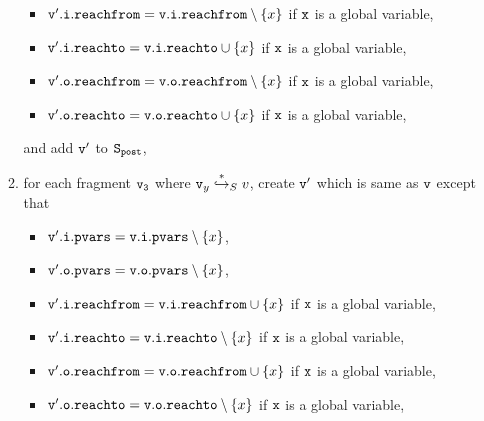 \begin{itemize}
\begin{enumerate}
\begin{itemize}
\item $\mathtt{v}'.\mathtt{i}.\mathtt{reachfrom} = \mathtt{v}.\mathtt{i}.\mathtt{reachfrom} \setminus \left\{x\right\}$ if $\tt x$ is a global variable,
\item $\mathtt{v}'.\mathtt{i}.\mathtt{reachto} = \mathtt{v}.\mathtt{i}.\mathtt{reachto} \cup \left\{x\right\}$ if $\tt x$ is a global variable,
\item $\mathtt{v}'.\mathtt{o}.\mathtt{reachfrom} = \mathtt{v}.\mathtt{o}.\mathtt{reachfrom} \setminus \left\{x\right\}$ if $\tt x$ is a global variable,
\item $\mathtt{v}'.\mathtt{o}.\mathtt{reachto} = \mathtt{v}.\mathtt{o}.\mathtt{reachto} \cup \left\{x\right\}$ if $\tt x$ is a global variable,
\end{itemize}
and add $\tt v'$ to $\tt S_{post}$,
\item for each fragment $\tt v_3$ where $\mathtt{v}_y \overset{*}\hookrightarrow_S v$, create $\tt v'$ which is same as $\tt v$ except that
\begin{itemize}
\item $\mathtt{v}'.\mathtt{i}.\mathtt{pvars} = \mathtt{v}.\mathtt{i}.\mathtt{pvars} \setminus \left\{x\right\}$,
\item $\mathtt{v}'.\mathtt{o}.\mathtt{pvars} = \mathtt{v}.\mathtt{o}.\mathtt{pvars} \setminus \left\{x\right\}$,
\item $\mathtt{v}'.\mathtt{i}.\mathtt{reachfrom} = \mathtt{v}.\mathtt{i}.\mathtt{reachfrom} \cup \left\{x\right\}$ if $\tt x$ is a global variable,
\item $\mathtt{v}'.\mathtt{i}.\mathtt{reachto} = \mathtt{v}.\mathtt{i}.\mathtt{reachto} \setminus \left\{x\right\}$ if $\tt x$ is a global variable,

 \item $\mathtt{v}'.\mathtt{o}.\mathtt{reachfrom} = \mathtt{v}.\mathtt{o}.\mathtt{reachfrom} \cup \left\{x\right\}$ if $\tt x$ is a global variable,
 \item $\mathtt{v}'.\mathtt{o}.\mathtt{reachto} = \mathtt{v}.\mathtt{o}.\mathtt{reachto} \setminus \left\{x\right\}$ if $\tt x$ is a global variable,


\end{itemize}
\end{enumerate}
\end{itemize}
